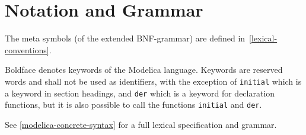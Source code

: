 \section{Notation and Grammar}\label{notation-and-grammar}

The meta symbols (of the extended BNF-grammar) are defined in~\cref{lexical-conventions}.

Boldface denotes keywords of the Modelica language.
Keywords are reserved words and shall not be used as identifiers, with the exception of \lstinline!initial! which is a keyword in section headings, and \lstinline!der! which is a keyword for declaration functions, but it is also possible to call the functions \lstinline!initial! and \lstinline!der!.

See \cref{modelica-concrete-syntax} for a full lexical specification and grammar.
